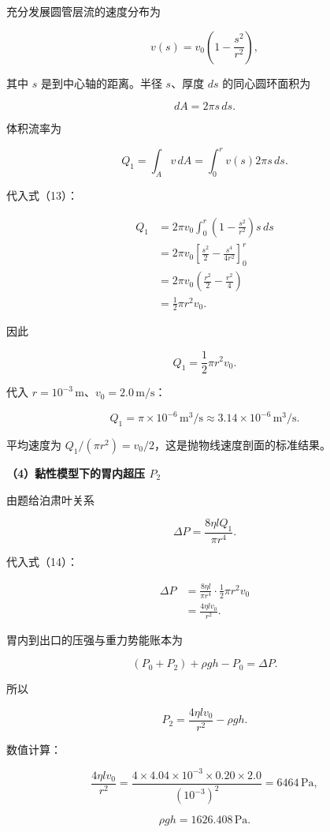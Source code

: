 \documentclass[12pt,a4paper,UTF8]{ctexart}
\begin{document}
充分发展圆管层流的速度分布为

\[
v(s)=v_0\left(1-\frac{s^2}{r^2}\right),
\tag{13}
\]

其中 \(s\) 是到中心轴的距离。半径 \(s\)、厚度 \(ds\) 的同心圆环面积为

\[
dA=2\pi s\,ds.
\]

体积流率为

\[
Q_1=\int_Av\,dA
=\int_0^rv(s)2\pi s\,ds.
\]

代入式（13）：

\[
\begin{aligned}
Q_1
&=2\pi v_0\int_0^r\left(1-\frac{s^2}{r^2}\right)s\,ds\\
&=2\pi v_0\left[\frac{s^2}{2}-\frac{s^4}{4r^2}\right]_0^r\\
&=2\pi v_0\left(\frac{r^2}{2}-\frac{r^2}{4}\right)\\
&=\frac12\pi r^2v_0.
\end{aligned}
\]

因此

\[
\boxed{Q_1=\frac12\pi r^2v_0}.
\tag{14}
\]

代入 \(r=10^{-3}\,\mathrm m\)、\(v_0=2.0\,\mathrm{m/s}\)：

\[
\boxed{Q_1=\pi\times10^{-6}\,\mathrm{m^3/s}
\approx3.14\times10^{-6}\,\mathrm{m^3/s}}.
\tag{15}
\]

平均速度为 \(Q_1/(\pi r^2)=v_0/2\)，这是抛物线速度剖面的标准结果。

\textbf{（4）黏性模型下的胃内超压 \(P_2\)}

由题给泊肃叶关系

\[
\Delta P=\frac{8\eta lQ_1}{\pi r^4}.
\]

代入式（14）：

\[
\begin{aligned}
\Delta P
&=\frac{8\eta l}{\pi r^4}\cdot\frac12\pi r^2v_0\\
&=\frac{4\eta lv_0}{r^2}.
\end{aligned}
\tag{16}
\]

胃内到出口的压强与重力势能账本为

\[
(P_0+P_2)+\rho gh-P_0=\Delta P.
\tag{17}
\]

所以

\[
\boxed{P_2=\frac{4\eta lv_0}{r^2}-\rho gh}.
\tag{18}
\]

数值计算：

\[
\frac{4\eta lv_0}{r^2}
=\frac{4\times4.04\times10^{-3}\times0.20\times2.0}{(10^{-3})^2}
=6464\,\mathrm{Pa},
\]

\[
\rho gh=1626.408\,\mathrm{Pa}.
\]
\end{document}
